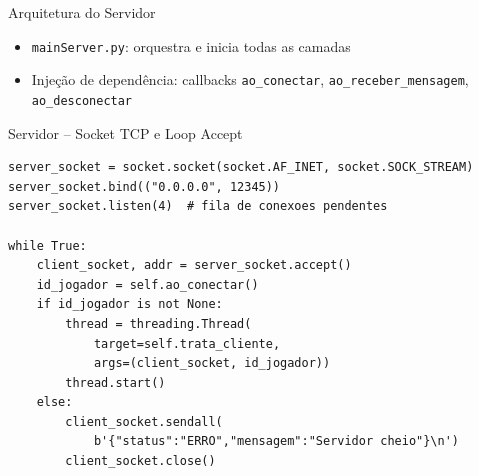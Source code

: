 \documentclass[aspectratio=169]{beamer}
\begin{document}
\begin{frame}{Arquitetura do Servidor}
  \begin{center}
  \end{center}
  \begin{itemize}
    \item \texttt{mainServer.py}: orquestra e inicia todas as camadas
    \item Inje\c{c}\~ao de depend\^encia: callbacks \texttt{ao\_conectar}, \texttt{ao\_receber\_mensagem}, \texttt{ao\_desconectar}
  \end{itemize}
\end{frame}

\begin{frame}[fragile, shrink=8]{Servidor -- Socket TCP e Loop Accept}
\begin{lstlisting}[style=pycode, basicstyle=\ttfamily\footnotesize]
server_socket = socket.socket(socket.AF_INET, socket.SOCK_STREAM)
server_socket.bind(("0.0.0.0", 12345))
server_socket.listen(4)  # fila de conexoes pendentes

while True:
    client_socket, addr = server_socket.accept()
    id_jogador = self.ao_conectar()
    if id_jogador is not None:
        thread = threading.Thread(
            target=self.trata_cliente,
            args=(client_socket, id_jogador))
        thread.start()
    else:
        client_socket.sendall(
            b'{"status":"ERRO","mensagem":"Servidor cheio"}\n')
        client_socket.close()
\end{lstlisting}
\end{frame}
\end{document}
